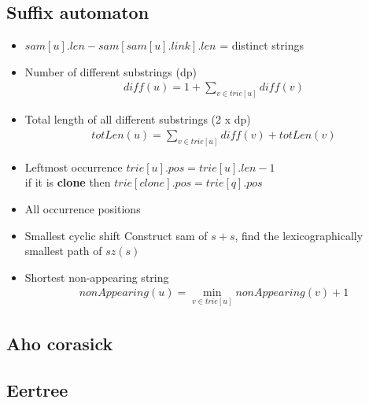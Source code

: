 
\subsection{Suffix automaton }
\vspace{-5pt}
\begin{itemize}[noitemsep]
  \item 
  $sam[u].len- sam[sam[u].link].len$ = distinct strings

  \item Number of different substrings (dp)
  \begin{gather*}
    diff(u)=1+\sum_{v \in trie[u]}{diff(v)}
  \end{gather*}

  \item Total length of all different substrings (2 x dp)
  \begin{gather*}
    totLen(u)=\sum_{v \in trie[u]}{diff(v) + totLen(v)}
  \end{gather*}
  
  \item Leftmost occurrence
  $trie[u].pos = trie[u].len - 1$ \\
  if it is \textbf{clone} then $trie[clone].pos = trie[q].pos$ 
  
  \item All occurrence positions
  
  \item Smallest cyclic shift 
  Construct sam of $s + s$, find the lexicographically smallest path of $sz(s)$
 
  \item Shortest non-appearing string
  \begin{gather*}
    nonAppearing(u) = \min_{v \in trie[u]}{nonAppearing(v) + 1}
  \end{gather*}
\end{itemize}
\vspace{-15pt}

\subsection{Aho corasick }

\subsection{Eertree }
